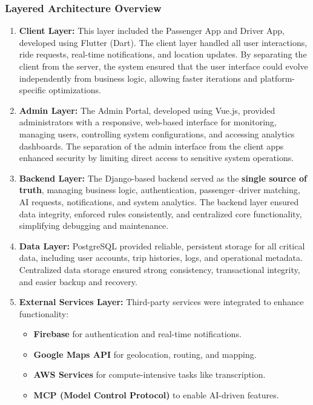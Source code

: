 \subsubsection{Layered Architecture Overview}

\begin{enumerate}
 \item \textbf{Client Layer:} This layer included the Passenger App and
        Driver App, developed using Flutter (Dart). The client layer handled all
        user interactions, ride requests, real-time notifications, and location
        updates. By separating the client from the server, the system ensured
        that the user interface could evolve independently from business logic,
        allowing faster iterations and platform-specific optimizations.

 \item \textbf{Admin Layer:} The Admin Portal, developed using Vue.js,
        provided administrators with a responsive, web-based interface for
        monitoring, managing users, controlling system configurations, and
        accessing analytics dashboards. The separation of the admin interface
        from the client apps enhanced security by limiting direct access to
        sensitive system operations.

 \item \textbf{Backend Layer:} The Django-based backend served as the
        \textbf{single source of truth}, managing business logic,
        authentication, passenger–driver matching, AI requests, notifications,
        and system analytics. The backend layer ensured data integrity, enforced
        rules consistently, and centralized core functionality, simplifying
        debugging and maintenance.

 \item \textbf{Data Layer:} PostgreSQL provided reliable, persistent
        storage for all critical data, including user accounts, trip histories,
        logs, and operational metadata. Centralized data storage ensured strong
        consistency, transactional integrity, and easier backup and recovery.

 \item \textbf{External Services Layer:} Third-party services were
        integrated to enhance functionality:
        \begin{itemize}
 \item \textbf{Firebase} for authentication and real-time notifications.
 \item \textbf{Google Maps API} for geolocation, routing, and mapping.
 \item \textbf{AWS Services} for compute-intensive tasks like
        transcription.
 \item \textbf{MCP (Model Control Protocol)} to enable AI-driven
        features.
        \end{itemize}
\end{enumerate}

